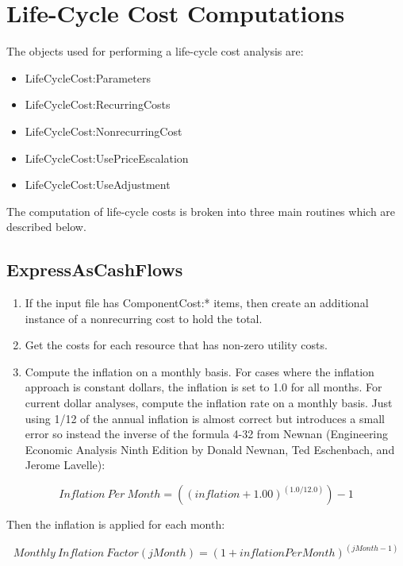 \section{Life-Cycle Cost Computations}\label{life-cycle-cost-computations}

The objects used for performing a life-cycle cost analysis are:

\begin{itemize}
\item
  LifeCycleCost:Parameters
\item
  LifeCycleCost:RecurringCosts
\item
  LifeCycleCost:NonrecurringCost
\item
  LifeCycleCost:UsePriceEscalation
\item
  LifeCycleCost:UseAdjustment
\end{itemize}

The computation of life-cycle costs is broken into three main routines which are described below.

\subsection{ExpressAsCashFlows}\label{expressascashflows}

\begin{enumerate}
\def\labelenumi{Step~\arabic{enumi}.}
\item If the input file has ComponentCost:* items, then create an additional instance of a nonrecurring cost to hold the total.
\item Get the costs for each resource that has non-zero utility costs.
\item Compute the inflation on a monthly basis. For cases where the inflation approach is constant dollars, the inflation is set to 1.0 for all months. For current dollar analyses, compute the inflation rate on a monthly basis. Just using 1/12 of the annual inflation is almost correct but introduces a small error so instead the inverse of the formula 4-32 from Newnan (Engineering Economic Analysis Ninth Edition by Donald Newnan, Ted Eschenbach, and Jerome Lavelle):
\end{enumerate}

\begin{equation}
Inflation~Per~Month = ((inflation + 1.00) ^ (1.0/12.0)) - 1
\end{equation}

Then the inflation is applied for each month:

\begin{equation}
Monthly~Inflation~Factor(jMonth) = (1 + inflationPerMonth) ^ (jMonth - 1)
\end{equation}

